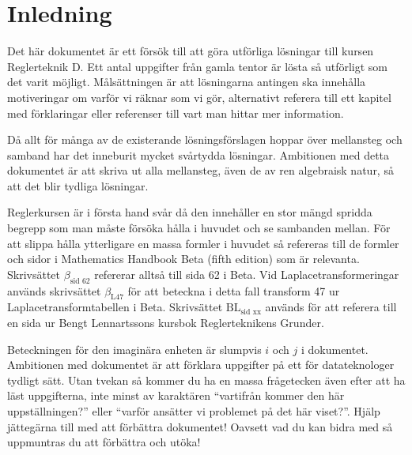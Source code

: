 \documentclass[a4paper]{article}
\newcommand{\mhb}[1]{$\beta_{\text{#1}}$}     %
\newcommand{\bl}[1]{$\text{BL}_{\text{#1}}$}  %
\begin{document}



\section*{Inledning}
Det här dokumentet är ett försök till att göra utförliga lösningar till kursen Reglerteknik D. Ett antal uppgifter från gamla tentor är lösta så utförligt som det varit möjligt. Målsättningen är att lösningarna antingen ska innehålla motiveringar om varför vi räknar som vi gör, alternativt referera till ett kapitel med förklaringar eller referenser till vart man hittar mer information.

Då allt för många av de existerande lösningsförslagen hoppar över mellansteg och samband har det inneburit mycket svårtydda lösningar. Ambitionen med detta dokumentet är att skriva ut alla mellansteg, även de av ren algebraisk natur, så att det blir tydliga lösningar.

Reglerkursen är i första hand svår då den innehåller en stor mängd spridda begrepp som man måste försöka hålla i huvudet och se sambanden mellan. För att slippa hålla ytterligare en massa formler i huvudet så refereras till de formler och sidor i Mathematics Handbook Beta (fifth edition) som är relevanta. Skrivsättet \mhb{sid 62} refererar alltså till sida 62 i Beta. Vid Laplacetransformeringar används skrivsättet \mhb{L47} för att beteckna i detta fall transform 47 ur Laplacetransformtabellen i Beta. Skrivsättet \bl{sid xx} används för att referera till en sida ur Bengt Lennartssons kursbok Reglerteknikens Grunder.

Beteckningen för den imaginära enheten är slumpvis $i$ och $j$ i dokumentet.\\

Ambitionen med dokumentet är att förklara uppgifter på ett för datateknologer tydligt sätt. Utan tvekan så kommer du ha en massa frågetecken även efter att ha läst uppgifterna, inte minst av karaktären ``vartifrån kommer den här uppställningen?'' eller ``varför ansätter vi problemet på det här viset?''. Hjälp jättegärna till med att förbättra dokumentet! Oavsett vad du kan bidra med så uppmuntras du att förbättra och utöka!\\
\end{document}
